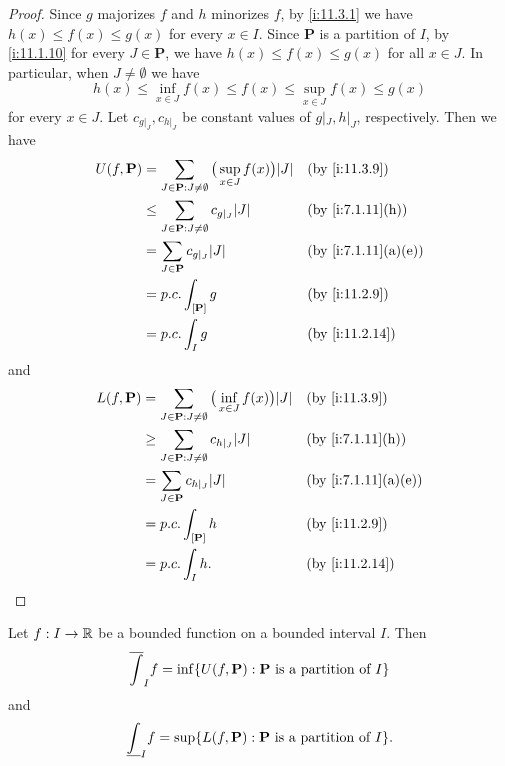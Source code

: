 \begin{proof}
  Since \(g\) majorizes \(f\) and \(h\) minorizes \(f\), by \cref{i:11.3.1} we have \(h(x) \leq f(x) \leq g(x)\) for every \(x \in I\).
  Since \(\mathbf{P}\) is a partition of \(I\), by \cref{i:11.1.10} for every \(J \in \mathbf{P}\), we have \(h(x) \leq f(x) \leq g(x)\) for all \(x \in J\).
  In particular, when \(J \neq \emptyset\) we have
  \[
    h(x) \leq \inf_{x \in J} f(x) \leq f(x) \leq \sup_{x \in J} f(x) \leq g(x)
  \]
  for every \(x \in J\).
  Let \(c_{g|_J}, c_{h|_J}\) be constant values of \(g|_J, h|_J\), respectively.
  Then we have
  \begin{align*}
    U(f, \mathbf{P}) & = \sum_{J \in \mathbf{P} : J \neq \emptyset} \big(\sup_{x \in J} f(x)\big) \abs{J} &  & \by{i:11.3.9}      \\
                     & \leq \sum_{J \in \mathbf{P} : J \neq \emptyset} c_{g|_J} \abs{J}                   &  & \by{i:7.1.11}[h]   \\
                     & = \sum_{J \in \mathbf{P}} c_{g|_J} \abs{J}                                         &  & \by{i:7.1.11}[a,e] \\
                     & = p.c. \int_{[\mathbf{P}]} g                                                       &  & \by{i:11.2.9}      \\
                     & = p.c. \int_I g                                                                    &  & \by{i:11.2.14}
  \end{align*}
  and
  \begin{align*}
    L(f, \mathbf{P}) & = \sum_{J \in \mathbf{P} : J \neq \emptyset} \big(\inf_{x \in J} f(x)\big) \abs{J} &  & \by{i:11.3.9}      \\
                     & \geq \sum_{J \in \mathbf{P} : J \neq \emptyset} c_{h|_J} \abs{J}                   &  & \by{i:7.1.11}[h]   \\
                     & = \sum_{J \in \mathbf{P}} c_{h|_J} \abs{J}                                         &  & \by{i:7.1.11}[a,e] \\
                     & = p.c. \int_{[\mathbf{P}]} h                                                       &  & \by{i:11.2.9}      \\
                     & = p.c. \int_I h.                                                                   &  & \by{i:11.2.14}
  \end{align*}
\end{proof}

\begin{prop}\label{i:11.3.12}
  Let \(f : I \to \mathbb{R}\) be a bounded function on a bounded interval \(I\).
  Then
  \[
    \overline{\int}_I f = \inf\set{U(f, \mathbf{P}) : \mathbf{P} \text{ is a partition of } I}
  \]
  and
  \[
    \underline{\int}_I f = \sup\set{L(f, \mathbf{P}) : \mathbf{P} \text{ is a partition of } I}.
  \]
\end{prop}

